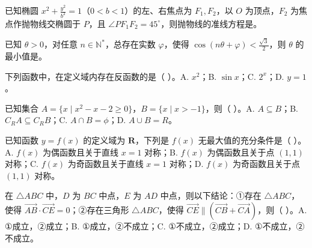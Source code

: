 \begin{question}
已知椭圆 $x^2+\frac{y^2}{b^2}=1$（$0<b<1$）的左、右焦点为 $F_1,F_2$，以 $O$ 为顶点，$F_2$ 为焦点作抛物线交椭圆于 $P$，且 $\angle PF_1F_2=45^\circ$，则抛物线的准线方程是\gkblank{}。

\end{question}
\begin{question}
已知 $\theta>0$，对任意 $n\in\mathbb N^*$，总存在实数 $\varphi$，使得 $\cos(n\theta+\varphi)<\frac{\sqrt3}{2}$，则 $\theta$ 的最小值是\gkblank{}。

\end{question}

\begin{question}
下列函数中，在定义域内存在反函数的是（ ）。A. $x^2$；B. $\sin x$；C. $2^x$；D. $y=1$。

\end{question}
\begin{question}
已知集合 $A=\{x\mid x^2-x-2\ge0\}$，$B=\{x\mid x>-1\}$，则（ ）。A. $A\subseteq B$；B. $C_R A\subseteq C_R B$；C. $A\cap B=\phi$；D. $A\cup B=R$。

\end{question}
\begin{question}
已知函数 $y=f(x)$ 的定义域为 $\mathbf R$，下列是 $f(x)$ 无最大值的充分条件是（ ）。A. $f(x)$ 为偶函数且关于直线 $x=1$ 对称；B. $f(x)$ 为偶函数且关于点 $(1,1)$ 对称；C. $f(x)$ 为奇函数且关于直线 $x=1$ 对称；D. $f(x)$ 为奇函数且关于点 $(1,1)$ 对称。

\end{question}
\begin{question}
在 $\triangle ABC$ 中，$D$ 为 $BC$ 中点，$E$ 为 $AD$ 中点，则以下结论：①存在 $\triangle ABC$，使得 $\overrightarrow{AB}\cdot\overrightarrow{CE}=0$；②存在三角形 $\triangle ABC$，使得 $\overrightarrow{CE}\parallel(\overrightarrow{CB}+\overrightarrow{CA})$，则（ ）。A. ①成立，②成立；B. ①成立，②不成立；C. ①不成立，②成立；D. ①不成立，②不成立。

\end{question}


